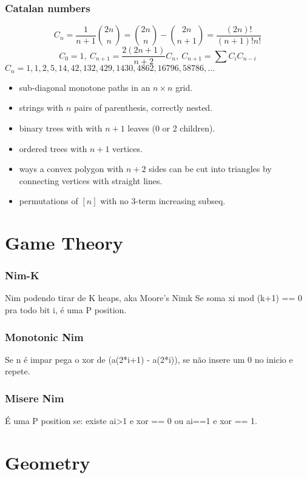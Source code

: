 \documentclass{article}
\begin{document}
	\subsection{Catalan numbers}
		\[ C_n=\frac{1}{n+1}\binom{2n}{n}= \binom{2n}{n}-\binom{2n}{n+1} = \frac{(2n)!}{(n+1)!n!} \]
		\[ C_0=1,\ C_{n+1} = \frac{2(2n+1)}{n+2}C_n,\ C_{n+1}=\sum C_iC_{n-i} \]
		${C_n = 1, 1, 2, 5, 14, 42, 132, 429, 1430, 4862, 16796, 58786, \dots}$
		\begin{itemize}[noitemsep]
			\item sub-diagonal monotone paths in an $n\times n$ grid.
			\item strings with $n$ pairs of parenthesis, correctly nested.
			\item binary trees with with $n+1$ leaves (0 or 2 children).
			\item ordered trees with $n+1$ vertices.
			\item ways a convex polygon with $n+2$ sides can be cut into triangles by connecting vertices with straight lines.
			\item permutations of $[n]$ with no 3-term increasing subseq.
		\end{itemize}


\chapter{Game Theory}

\subsection{Nim-K}
Nim podendo tirar de K heaps, aka Moore’s Nimk
Se soma xi mod (k+1) == 0 pra todo bit i, é uma P position.

\subsection{Monotonic Nim}
Se n é impar pega o xor de (a(2*i+1) - a(2*i)), se não insere um 0 no inicio e repete.

\subsection{Misere Nim}
É uma P position se: existe ai>1 e xor == 0 ou ai==1 e xor == 1.

\chapter{Geometry}
\end{document}
